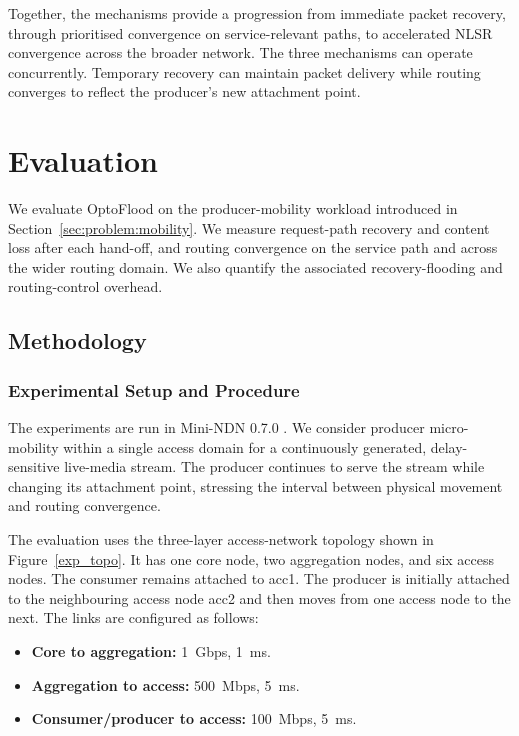 \documentclass[10pt,conference]{IEEEtran}
\begin{document}
Together, the mechanisms provide a progression from immediate packet recovery, through prioritised convergence on service-relevant paths, to accelerated NLSR convergence across the broader network. The three mechanisms can operate concurrently. Temporary recovery can maintain packet delivery while routing converges to reflect the producer's new attachment point.

\section{Evaluation}
\label{sec:evaluation}

We evaluate OptoFlood on the producer-mobility workload introduced in Section~\ref{sec:problem:mobility}. We measure request-path recovery and content loss after each hand-off, and routing convergence on the service path and across the wider routing domain. We also quantify the associated recovery-flooding and routing-control overhead.

\subsection{Methodology}
\label{sec:evaluation:methodology}

\subsubsection{Experimental Setup and Procedure}

The experiments are run in Mini-NDN 0.7.0 \cite{lantz:2010:mininet}. We consider producer micro-mobility within a single access domain for a continuously generated, delay-sensitive live-media stream. The producer continues to serve the stream while changing its attachment point, stressing the interval between physical movement and routing convergence.

The evaluation uses the three-layer access-network topology shown in Figure~\ref{exp_topo}. It has one core node, two aggregation nodes, and six access nodes. The consumer remains attached to acc1. The producer is initially attached to the neighbouring access node acc2 and then moves from one access node to the next. The links are configured as follows:
\begin{itemize}
    \item \textbf{Core to aggregation:} 1~Gbps, 1~ms.
    \item \textbf{Aggregation to access:} 500~Mbps, 5~ms.
    \item \textbf{Consumer/producer to access:} 100~Mbps, 5~ms.
\end{itemize}
\end{document}
